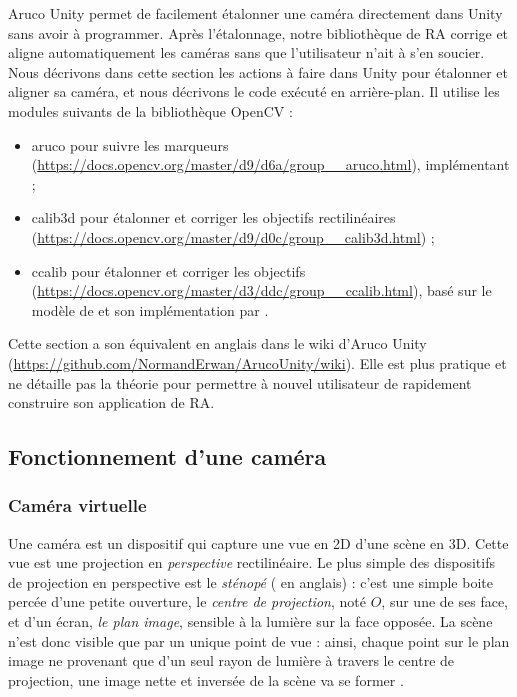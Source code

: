 Aruco Unity permet de facilement étalonner une caméra directement dans Unity sans avoir à programmer. Après l'étalonnage, notre bibliothèque de RA corrige et aligne automatiquement les caméras sans que l'utilisateur n'ait à s'en soucier. Nous décrivons dans cette section les actions à faire dans Unity pour étalonner et aligner sa caméra, et nous décrivons le code exécuté en arrière-plan. Il utilise les modules suivants de la bibliothèque OpenCV :
\begin{itemize}
 \item aruco pour suivre les marqueurs (\url{https://docs.opencv.org/master/d9/d6a/group__aruco.html}), implémentant \cite{Garrido-Jurado2014} ;
 \item calib3d pour étalonner et corriger les objectifs rectilinéaires (\url{https://docs.opencv.org/master/d9/d0c/group__calib3d.html}) ;
 \item ccalib pour étalonner et corriger les objectifs  (\url{https://docs.opencv.org/master/d3/ddc/group__ccalib.html}), basé sur le modèle de \cite{Mei2007} et son implémentation par \cite{Li2013}.
\end{itemize}

Cette section a son équivalent en anglais dans le wiki d'Aruco Unity (\url{https://github.com/NormandErwan/ArucoUnity/wiki}). Elle est plus pratique et ne détaille pas la théorie pour permettre à nouvel utilisateur de rapidement construire son application de RA.

\subsection{Fonctionnement d'une caméra}
\label{subsec:camera_theory}

\subsubsection{Caméra virtuelle}
Une caméra est un dispositif qui capture une vue en 2D d'une scène en 3D. Cette vue est une projection en \emph{perspective} rectilinéaire. Le plus simple des dispositifs de projection en perspective est le \emph{sténopé} ( en anglais) : c'est une simple boite percée d'une petite ouverture, le \emph{centre de projection}, noté $O$, sur une de ses face, et d'un écran, \emph{le plan image}, sensible à la lumière sur la face opposée. La scène n'est donc visible que par un unique point de vue : ainsi, chaque point sur le plan image ne provenant que d'un seul rayon de lumière à travers le centre de projection, une image nette et inversée de la scène va se former .

